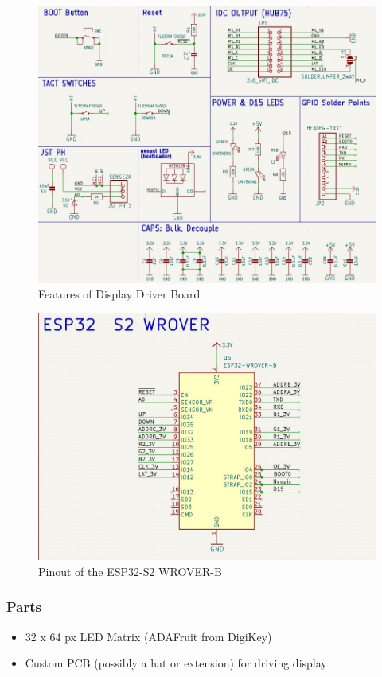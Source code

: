 \begin{figure}[H]
    \centering
    \includegraphics[width=12cm]{images/DisplayDriver/DriverBoardFeatures.jpg}
    \caption{Features of Display Driver Board}
\end{figure}

\begin{figure}[H]
    \centering
    \includegraphics[width=12cm]{images/DisplayDriver/WroverUsage.jpg}
    \caption{Pinout of the ESP32-S2 WROVER-B}
\end{figure}

\FloatBarrier

\subsubsection{Parts}
\begin{itemize}
    \item 32 x 64 px LED Matrix (ADAFruit from DigiKey)
    \item Custom PCB (possibly a hat or extension) for driving display
\end{itemize}

